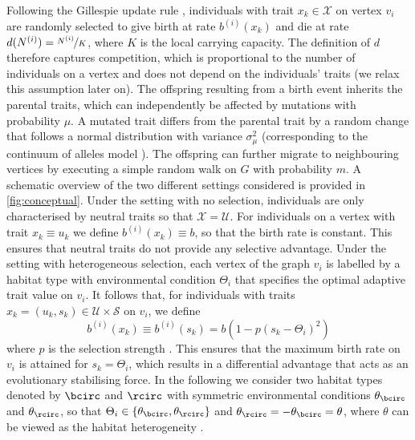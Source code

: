 Following the Gillespie update rule \citep{Gillespie1976}, individuals with trait $x_k \in \mathcal{X}$ on vertex $v_i$ are randomly selected to give birth at rate $b^{(i)}(x_k)$ and die at rate $d(N^{(i)}) = \nicefrac{N^{(i)}}{K}$, where $K$ is the local carrying capacity. 
% 
The definition of $d$ therefore captures competition, which is proportional to the number of individuals on a vertex and does not depend on the individuals' traits (we relax this assumption later on).
%
The offspring resulting from a birth event inherits the parental traits, which can independently be affected by mutations with probability $\mu$. A mutated trait differs from the parental trait by a random change that follows a normal distribution with variance $\sigma_\mu^2$ (corresponding to the continuum of alleles model \citep{Kimura1964}). The offspring can further migrate to neighbouring vertices by executing a simple random walk on $G$ with probability $m$.
%
A schematic overview of the two different settings considered is provided in \cref{fig:conceptual}. Under the setting with no selection, individuals are only characterised by neutral traits so that $\mathcal{X} = \mathcal{U}$.
%
For individuals on a vertex with trait $x_k\equiv u_k$ we define $b^{(i)}(x_k) \equiv b$, so that the birth rate is constant. This ensures that neutral traits do not provide any selective advantage.
%
Under the setting with heterogeneous selection, each vertex of the graph $v_i$ is labelled by a habitat type with environmental condition $\Theta_i$ that specifies the optimal adaptive trait value on $v_i$. It follows that, for individuals with traits $x_k = (u_k,s_k) \in \mathcal{U}\times \mathcal{S}$ on $v_i$, we define 
\begin{equation} \label{eq:birth_fun}
 b^{(i)}(x_k) \equiv b^{(i)}(s_k) = b(1 - p(s_k - \Theta_i)^2)
\end{equation}
%
where $p$ is the selection strength \citep{Mirrahimi2020}. This ensures that the maximum birth rate on $v_i$ is attained for $s_k = \Theta_i$, which results in a differential advantage that acts as an evolutionary stabilising force. In the following we consider two habitat types denoted by $\bcirc$ and $\rcirc$ with symmetric environmental conditions $\theta_\bcirc$ and $\theta_\rcirc$, so that $\Theta_i \in \{\theta_{\bcirc},\theta_{\rcirc}\}$ and $\theta_{\rcirc} = -\theta_{\bcirc} = \theta$, where $\theta$ can be viewed as the habitat heterogeneity \citep{Mirrahimi2020}.

